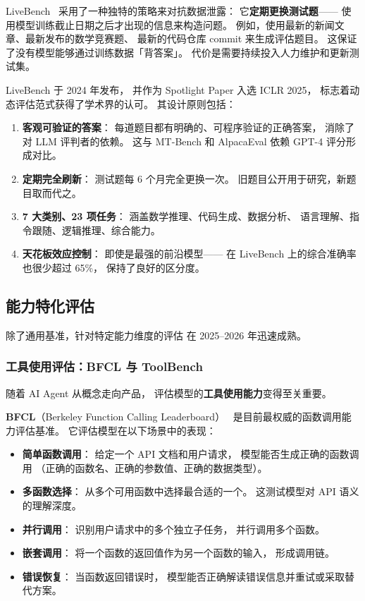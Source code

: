 \begin{keybox}
LiveBench~\cite{white2024livebench} 采用了一种独特的策略来对抗数据泄露：
它\textbf{定期更换测试题}——
使用模型训练截止日期之后才出现的信息来构造问题。
例如，使用最新的新闻文章、最新发布的数学竞赛题、
最新的代码仓库 commit 来生成评估题目。
这保证了没有模型能够通过训练数据「背答案」。
代价是需要持续投入人力维护和更新测试集。
\end{keybox}

LiveBench 于 2024 年发布，
并作为 Spotlight Paper 入选 ICLR 2025，
标志着动态评估范式获得了学术界的认可。
其设计原则包括：

\begin{enumerate}[noitemsep]
  \item \textbf{客观可验证的答案}：
        每道题目都有明确的、可程序验证的正确答案，
        消除了对 LLM 评判者的依赖。
        这与 MT-Bench 和 AlpacaEval 依赖 GPT-4 评分形成对比。
  \item \textbf{定期完全刷新}：
        测试题每 6 个月完全更换一次。
        旧题目公开用于研究，新题目取而代之。
  \item \textbf{7 大类别、23 项任务}：
        涵盖数学推理、代码生成、数据分析、
        语言理解、指令跟随、逻辑推理、综合能力。
  \item \textbf{天花板效应控制}：
        即使是最强的前沿模型——
        在 LiveBench 上的综合准确率也很少超过 65\%，
        保持了良好的区分度。
\end{enumerate}

\subsection{能力特化评估}
\label{subsec:capability-specific-eval}

除了通用基准，针对特定能力维度的评估
在 2025--2026 年迅速成熟。

\subsubsection{工具使用评估：BFCL 与 ToolBench}

随着 AI Agent 从概念走向产品，
评估模型的\textbf{工具使用能力}变得至关重要。

\textbf{BFCL}（Berkeley Function Calling Leaderboard）~\cite{patil2024bfcl}
是目前最权威的函数调用能力评估基准。
它评估模型在以下场景中的表现：
\begin{itemize}[noitemsep]
  \item \textbf{简单函数调用}：
        给定一个 API 文档和用户请求，
        模型能否生成正确的函数调用
        （正确的函数名、正确的参数值、正确的数据类型）。
  \item \textbf{多函数选择}：
        从多个可用函数中选择最合适的一个。
        这测试模型对 API 语义的理解深度。
  \item \textbf{并行调用}：
        识别用户请求中的多个独立子任务，
        并行调用多个函数。
  \item \textbf{嵌套调用}：
        将一个函数的返回值作为另一个函数的输入，
        形成调用链。
  \item \textbf{错误恢复}：
        当函数返回错误时，
        模型能否正确解读错误信息并重试或采取替代方案。
\end{itemize}

